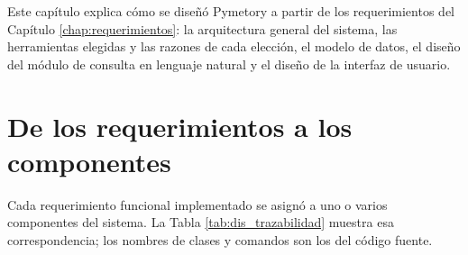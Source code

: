 
Este capítulo explica cómo se diseñó Pymetory a partir de los requerimientos del Capítulo \ref{chap:requerimientos}: la arquitectura general del sistema, las herramientas elegidas y las razones de cada elección, el modelo de datos, el diseño del módulo de consulta en lenguaje natural y el diseño de la interfaz de usuario.

\section{De los requerimientos a los componentes}
\label{sec:dis_trazabilidad}

Cada requerimiento funcional implementado se asignó a uno o varios componentes del sistema. La Tabla \ref{tab:dis_trazabilidad} muestra esa correspondencia; los nombres de clases y comandos son los del código fuente.

